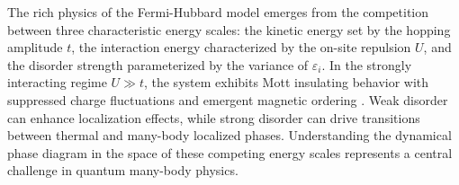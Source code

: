 The rich physics of the Fermi-Hubbard model emerges from the competition between three characteristic energy scales: the kinetic energy set by the hopping amplitude $t$, the interaction energy characterized by the on-site repulsion $U$, and the disorder strength parameterized by the variance of $\varepsilon_i$. In the strongly interacting regime $U \gg t$, the system exhibits Mott insulating behavior with suppressed charge fluctuations and emergent magnetic ordering \cite{mazurenko_cold-atom_2017}. Weak disorder can enhance localization effects, while strong disorder can drive transitions between thermal and many-body localized phases. Understanding the dynamical phase diagram in the space of these competing energy scales represents a central challenge in quantum many-body physics.
